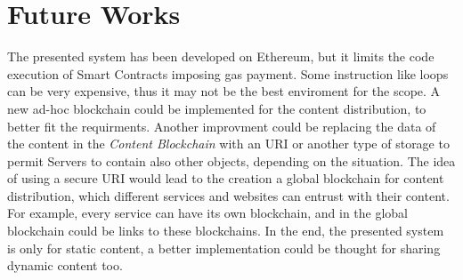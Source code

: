 \documentclass[conference,compsoc]{IEEEtran}
\begin{document}
\section{Future Works}

The presented system has been developed on Ethereum, but it limits the code execution of Smart Contracts imposing gas payment. Some instruction like loops can be very expensive, thus it may not be the best enviroment for the scope. A new ad-hoc blockchain could be implemented for the content distribution, to better fit the requirments. 
Another improvment could be replacing the data of the content in the \textit{Content Blockchain} with an URI or another type of storage to permit Servers to contain also other objects, depending on the situation.
The idea of using a secure URI would lead to the creation a global blockchain for content distribution, which different services and websites can entrust with their content. For example, every service can have its own blockchain, and in the global blockchain could be links to these blockchains.
In the end, the presented system is only for static content, a better implementation could be thought for sharing dynamic content too.

%
%

\end{document}
